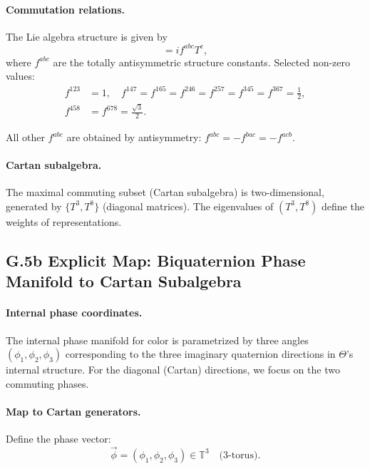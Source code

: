 \paragraph{Commutation relations.} The Lie algebra structure is given by
\begin{equation}
[T^a, T^b] = i f^{abc} T^c,
\label{eq:su3-commutator}
\end{equation}
where $f^{abc}$ are the totally antisymmetric structure constants. Selected non-zero values:
\begin{align}
f^{123} &= 1, \quad f^{147} = f^{165} = f^{246} = f^{257} = f^{345} = f^{367} = \frac{1}{2}, \nonumber \\
f^{458} &= f^{678} = \frac{\sqrt{3}}{2}.
\label{eq:structure-constants}
\end{align}

All other $f^{abc}$ are obtained by antisymmetry: $f^{abc} = -f^{bac} = -f^{acb}$.

\paragraph{Cartan subalgebra.} The maximal commuting subset (Cartan subalgebra) is two-dimensional, generated by $\{T^3, T^8\}$ (diagonal matrices). The eigenvalues of $(T^3, T^8)$ define the weights of representations.

\subsection*{G.5b Explicit Map: Biquaternion Phase Manifold to Cartan Subalgebra}
\label{sec:G5b_phase_map}

\paragraph{Internal phase coordinates.} The internal phase manifold for color is parametrized by three angles $(\phi_1, \phi_2, \phi_3)$ corresponding to the three imaginary quaternion directions in $\Theta$'s internal structure. For the diagonal (Cartan) directions, we focus on the two commuting phases.

\paragraph{Map to Cartan generators.} Define the phase vector:
\begin{equation}
\vec{\phi} = (\phi_1, \phi_2, \phi_3) \in \mathbb{T}^3 \quad \text{(3-torus)}.
\label{eq:phase-vector}
\end{equation}


